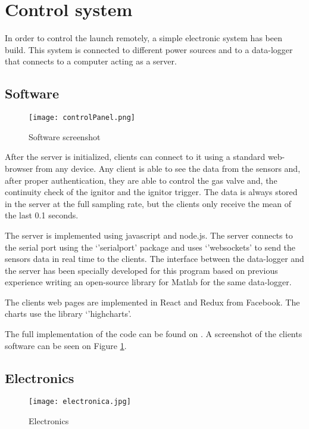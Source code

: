 
\section*{Control system}

In order to control the launch remotely, a simple electronic system has been build. This system is connected to different power sources and to a data-logger that connects to a computer acting as a server.

\subsection*{Software}

\begin{figure}[H]
  \centering
  \texttt{[image: controlPanel.png]}
  \caption{Software screenshot}
  \label{fig:softwareScreenshot}
\end{figure}

After the server is initialized, clients can connect to it using a standard web-browser from any device. Any client is able to see the data from the sensors and, after proper authentication, they are able to control the gas valve and, the continuity check of the ignitor and the ignitor trigger. The data is always stored in the server at the full sampling rate, but the clients only receive the mean of the last 0.1 seconds.

The server is implemented using javascript and node.js. The server connects to the serial port using the `'serialport' package and uses `'websockets' to send the sensors data in real time to the clients. The interface between the data-logger and the server has been specially developed for this program based on previous experience writing an open-source library for Matlab for the same data-logger.

The clients web pages are implemented in React and Redux from Facebook. The charts use the library `'highcharts'.

The full implementation of the code can be found on \cite{hybridControlPanelGithub}. A screenshot of the clients software can be seen on Figure \ref{fig:softwareScreenshot}.

\subsection*{Electronics}

\begin{figure}[H]
  \centering
  \texttt{[image: electronica.jpg]}
  \caption{Electronics}
  \label{fig:electronica}
\end{figure}


